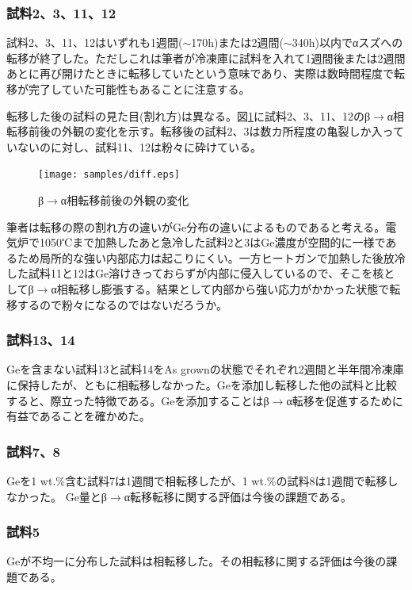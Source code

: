 \subsubsection{試料2、3、11、12}
試料2、3、11、12はいずれも1週間($\sim$170h)または2週間($\sim$340h)以内でαスズへの転移が終了した。ただしこれは筆者が冷凍庫に試料を入れて1週間後または2週間あとに再び開けたときに転移していたという意味であり、実際は数時間程度で転移が完了していた可能性もあることに注意する。

転移した後の試料の見た目(割れ方)は異なる。図\ref{fig:diff}に試料2、3、11、12のβ$\to$α相転移前後の外観の変化を示す。転移後の試料2、3は数カ所程度の亀裂しか入っていないのに対し、試料11、12は粉々に砕けている。
\begin{figure}[!h]
    \begin{center}
   \texttt{[image: samples/diff.eps]}
  \end{center}
  \caption{β$\to$α相転移前後の外観の変化}
  \label{fig:diff}
\end{figure}

筆者は転移の際の割れ方の違いがGe分布の違いによるものであると考える。電気炉で1050℃まで加熱したあと急冷した試料2と3はGe濃度が空間的に一様であるため局所的な強い内部応力は起こりにくい。一方ヒートガンで加熱した後放冷した試料11と12はGe溶けきっておらずが内部に侵入しているので、そこを核としてβ$\to$α相転移し膨張する。結果として内部から強い応力がかかった状態で転移するので粉々になるのではないだろうか。

\subsubsection{試料13、14}
Geを含まない試料13と試料14をAs grownの状態でそれぞれ2週間と半年間冷凍庫に保持したが、ともに相転移しなかった。Geを添加し転移した他の試料と比較すると、際立った特徴である。Geを添加することはβ$\to$α転移を促進するために有益であることを確かめた。

\subsubsection{試料7、8}
Geを1 wt.\%含む試料7は1週間で相転移したが、1 wt.\%の試料8は1週間で転移しなかった。
Ge量とβ$\to$α転移転移に関する評価は今後の課題である。

\subsubsection{試料5}
Geが不均一に分布した試料は相転移した。その相転移に関する評価は今後の課題である。

